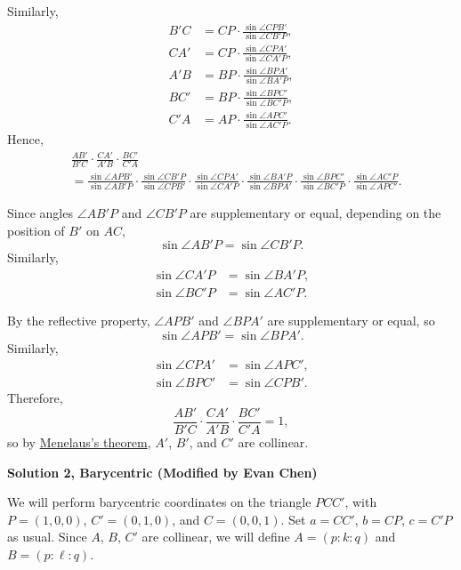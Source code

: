 \begin{enumerate}
 Similarly,
 \begin{align*} B'C &= CP \cdot \frac{\sin \angle CPB'}{\sin \angle CB'P}, \\ CA' &= CP \cdot \frac{\sin \angle CPA'}{\sin \angle CA'P}, \\ A'B &= BP \cdot \frac{\sin \angle BPA'}{\sin \angle BA'P}, \\ BC' &= BP \cdot \frac{\sin \angle BPC'}{\sin \angle BC'P}, \\ C'A &= AP \cdot \frac{\sin \angle APC'}{\sin \angle AC'P}. \end{align*}
Hence,
 \begin{align*} &\frac{AB'}{B'C} \cdot \frac{CA'}{A'B} \cdot \frac{BC'}{C'A} \\ &= \frac{\sin \angle APB'}{\sin \angle AB'P} \cdot \frac{\sin \angle CB'P}{\sin \angle CPB'} \cdot \frac{\sin \angle CPA'}{\sin \angle CA'P} \cdot \frac{\sin \angle BA'P}{\sin \angle BPA'} \cdot \frac{\sin \angle BPC'}{\sin \angle BC'P} \cdot \frac{\sin \angle AC'P}{\sin \angle APC'}. \end{align*}


 Since angles $\angle AB'P$ and $\angle CB'P$ are supplementary or equal, depending on the position of $B'$ on $AC$,
 \[\sin \angle AB'P = \sin \angle CB'P.\]Similarly,
 \begin{align*} \sin \angle CA'P &= \sin \angle BA'P, \\ \sin \angle BC'P &= \sin \angle AC'P. \end{align*}


 By the reflective property, $\angle APB'$ and $\angle BPA'$ are supplementary or equal, so
 \[\sin \angle APB' = \sin \angle BPA'.\]Similarly,
 \begin{align*} \sin \angle CPA' &= \sin \angle APC', \\ \sin \angle BPC' &= \sin \angle CPB'. \end{align*}
Therefore,
 \[\frac{AB'}{B'C} \cdot \frac{CA'}{A'B} \cdot \frac{BC'}{C'A} = 1,\]so by \href{https://artofproblemsolving.com/wiki/index.php?title=Menelaus\%27\_Theorem}{Menelaus's theorem}, $A'$, $B'$, and $C'$ are collinear.

 



\textbf{Solution 2, Barycentric (Modified by Evan Chen)}

We will perform barycentric coordinates on the triangle $PCC'$, with $P=(1,0,0)$, $C'=(0,1,0)$, and $C=(0,0,1)$. Set $a = CC'$, $b = CP$, $c = C'P$ as usual. Since $A$, $B$, $C'$ are collinear, we will define $A = (p : k : q)$ and $B = (p : \ell : q)$.


\end{enumerate}

